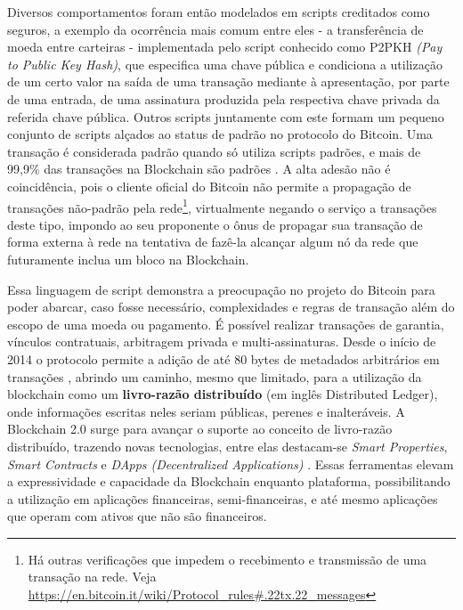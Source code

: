 \documentclass[a4paper,11pt]{article}
\begin{document}
Diversos comportamentos foram então modelados em scripts creditados como seguros, a exemplo da ocorrência mais comum entre eles - a transferência de moeda entre carteiras - implementada pelo script conhecido como P2PKH \emph{(Pay to Public Key Hash)}, que especifica uma chave pública e condiciona a utilização de um certo valor na saída de uma transação mediante à apresentação, por parte de uma entrada, de uma assinatura produzida pela respectiva chave privada da referida chave pública.
Outros scripts juntamente com este formam um pequeno conjunto de scripts alçados ao status de padrão no protocolo do Bitcoin.
Uma transação é considerada padrão quando só utiliza scripts padrões, e mais de 99,9\% das transações na Blockchain são padrões \cite{Bistarelli2019}. A alta adesão não é coincidência, pois o cliente oficial do Bitcoin não permite a propagação de transações não-padrão pela
rede\footnote{Há outras verificações que impedem o recebimento e transmissão de uma transação na rede. Veja \url{https://en.bitcoin.it/wiki/Protocol_rules\#.22tx.22_messages}},
virtualmente negando o serviço a transações deste tipo, impondo ao seu proponente o ônus de propagar sua transação de forma externa à rede na tentativa de fazê-la alcançar algum nó da rede que futuramente inclua um bloco na Blockchain.

Essa linguagem de script demonstra a preocupação no projeto do Bitcoin para poder abarcar, caso fosse necessário, complexidades e regras de transação além do escopo de uma moeda ou pagamento.
É possível realizar transações de garantia, vínculos contratuais, arbitragem privada e multi-assinaturas.
Desde o início de 2014 o protocolo permite a adição de até 80 bytes de metadados arbitrários em transações \cite{Greenspan2015}, abrindo um caminho, mesmo que limitado, para a utilização da blockchain como um \textbf{livro-razão distribuído} (em inglês Distributed Ledger), onde informações escritas neles seriam públicas, perenes e inalteráveis.
A Blockchain 2.0 surge para avançar o suporte ao conceito de livro-razão distribuído, trazendo novas tecnologias, entre elas destacam-se \emph{Smart Properties}, \emph{Smart Contracts} e \emph{DApps (Decentralized Applications)} \cite{Kuo2017, Swan2015}.
Essas ferramentas elevam a expressividade e capacidade da Blockchain enquanto plataforma, possibilitando a utilização em aplicações financeiras, semi-financeiras, e até mesmo aplicações que operam com ativos que não são financeiros.

\end{document}
